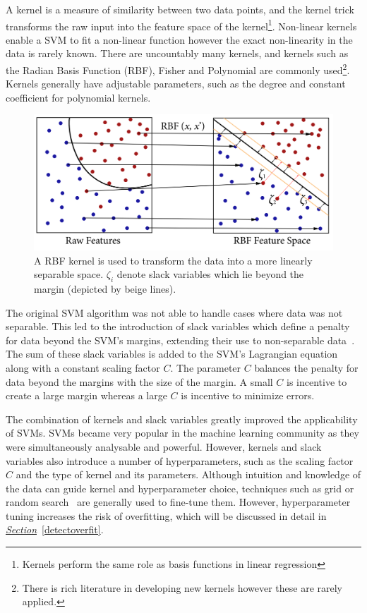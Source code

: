 \documentclass[12pt, twoside]{book}
\begin{document}
A kernel is a measure of similarity between two data points, and the kernel trick transforms the raw input into the feature space of the kernel\footnote{Kernels perform the same role as basis functions in linear regression}. Non-linear kernels enable a SVM to fit a non-linear function however the exact non-linearity in the data is rarely known. There are uncountably many kernels, and kernels such as the Radian Basis Function (RBF), Fisher and Polynomial are commonly used\footnote{There is rich literature in developing new kernels however these are rarely applied.}. Kernels generally have adjustable parameters, such as the degree and constant coefficient for polynomial kernels. 

\begin{figure}[h]
	\label{svm}
	\centering\includegraphics[width=0.8\linewidth]{svm.png}
	\caption{A RBF kernel is used to transform the data into a more linearly separable space. $\zeta_i$ denote slack variables which lie beyond the margin (depicted by beige lines). }
\end{figure}

The original SVM algorithm was not able to handle cases where data was not separable. This led to the introduction of slack variables which define a penalty for data beyond the SVM's margins, extending their use to non-separable data~\cite{cortes1995support}. The sum of these slack variables is added to the SVM's Lagrangian equation along with a constant scaling factor $C$. The parameter $C$ balances the penalty for data beyond the margins with the size of the margin. A small $C$ is incentive to create a large margin whereas a large $C$ is incentive to minimize errors.

The combination of kernels and slack variables greatly improved the applicability of SVMs. SVMs became very popular in the machine learning community as they were simultaneously analysable and powerful. However, kernels and slack variables also introduce a number of hyperparameters, such as the scaling factor $C$ and the type of kernel and its parameters. Although intuition and knowledge of the data can guide kernel and hyperparameter choice, techniques such as grid or random search~\cite{gridsearch} are generally used to fine-tune them. However, hyperparameter tuning increases the risk of overfitting, which will be discussed in detail in \textit{\hyperref[detectoverfit]{Section}}~\ref{detectoverfit}. 
\end{document}
